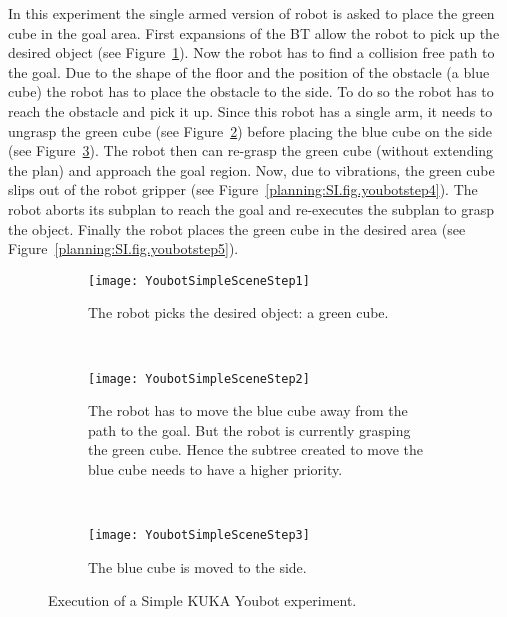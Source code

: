 {
\begin{experiment}
\label{planning:results.ex.1}
In this experiment the single armed version of robot is asked to place the green cube in the goal area. First expansions of the BT allow the robot to pick up the desired object (see Figure~\ref{planning:SI.fig.youbotstep1}). Now the robot has to find a collision free path to the goal. Due to the shape of the floor and the position of the obstacle (a blue cube) the robot has to place the obstacle to the side. To do so the robot has to reach the obstacle and pick it up. Since this robot has a single arm, it needs to ungrasp the green cube (see Figure~\ref{planning:SI.fig.youbotstep2}) before placing the blue cube on the side (see Figure~\ref{planning:SI.fig.youbotstep3}). The robot then can re-grasp the green cube (without extending the plan) and approach the goal region. Now, due to vibrations, the green cube slips out of the robot gripper (see Figure~\ref{planning:SI.fig.youbotstep4}). The robot aborts its subplan to reach the goal and re-executes the subplan to grasp the object.  Finally the robot places the green cube in the desired area (see Figure~\ref{planning:SI.fig.youbotstep5}).
\end{experiment}
\begin{figure}[h]
        \centering
        \begin{subfigure}[b]{1\columnwidth}
                \centering
                \texttt{[image: YoubotSimpleSceneStep1]}
                \caption{The robot picks the desired object: a green cube.  }
                \label{planning:SI.fig.youbotstep1}              
        \end{subfigure}       
        ~         
        \begin{subfigure}[b]{1\columnwidth}
                \centering
                \texttt{[image: YoubotSimpleSceneStep2]}
                \caption{The robot has to move the blue cube away from the path to the goal. But the robot is currently grasping the green cube. Hence the subtree created to move the blue cube needs to have a higher priority. }
 			\label{planning:SI.fig.youbotstep2}  
         \end{subfigure}
~
        \begin{subfigure}[b]{1\columnwidth}
                \centering
                \texttt{[image: YoubotSimpleSceneStep3]}
                \caption{The blue cube is moved to the side. }
                 \label{planning:SI.fig.youbotstep3}  
        \end{subfigure}   
        \caption{Execution of a Simple KUKA Youbot experiment.}
        \label{planning:SI.fig.yousimplescreen2}
\end{figure}
\clearpage

}
